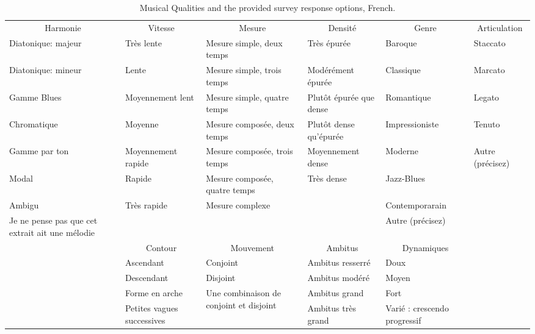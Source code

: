 \documentclass[
]{article}
\makeatletter
\newenvironment{lltable}{\begin{landscape}\begin{center}\begin{ThreePartTable}}{\end{ThreePartTable}\end{center}\end{landscape}}
\newcommand\LastLTentrywidth{1em}
\newlength\longtablewidth
\newcommand{\getlongtablewidth}{\begingroup \ifcsname LT@\roman{LT@tables}\endcsname \global\longtablewidth=0pt \renewcommand{\LT@entry}[2]{\global\advance\longtablewidth by ##2\relax\gdef\LastLTentrywidth{##2}}\@nameuse{LT@\roman{LT@tables}} \fi \endgroup}
\makeatother
\begin{document}
\begin{lltable}
\begin{footnotesize}
\begin{longtable}{p{}p{}p{}p{}p{}p{}}\noalign{\getlongtablewidth\global\LTcapwidth=\longtablewidth}
\caption{\label{tab:qualitiestablefr}Musical Qualities and the provided survey response options, French.}\\
\toprule[.8pt]
 \multicolumn{1}{c}{Harmonie} & \multicolumn{1}{c}{Vitesse} & \multicolumn{1}{c}{Mesure} & \multicolumn{1}{c}{Densité} & \multicolumn{1}{c}{Genre} & \multicolumn{1}{c}{Articulation}\\
 \midrule
      Diatonique: majeur & Très lente & Mesure simple, deux temps & Très épurée & Baroque & Staccato \\
      Diatonique: mineur & Lente & Mesure simple, trois temps & Modérément épurée & Classique & Marcato \\
      Gamme Blues & Moyennement lent & Mesure simple, quatre temps & Plutôt épurée que dense & Romantique & Legato\\
      Chromatique & Moyenne & Mesure composée, deux temps & Plutôt dense qu’épurée & Impressioniste & Tenuto\\
      Gamme par ton & Moyennement rapide & Mesure composée, trois temps & Moyennement dense & Moderne & Autre (précisez) \\       
      Modal  & Rapide & Mesure composée, quatre temps & Très dense & Jazz-Blues & \\
      Ambigu  & Très rapide & Mesure complexe & & Contemporarain & \\
      \multirow{2}{0.2\textwidth}{Je ne pense pas que cet extrait ait une mélodie}  & & & & Autre (précisez) & \\
      Autre (précisez)  & & & & & \\
\bottomrule\addlinespace[.5em]
 & \multicolumn{1}{c}{Contour} & \multicolumn{1}{c}{Mouvement} & \multicolumn{1}{c}{Ambitus} & \multicolumn{1}{c}{Dynamiques} & \\
 \cmidrule[.5pt]{2-5}
  & Ascendant & Conjoint & Ambitus resserré & Doux & \\
  & Descendant & Disjoint & Ambitus modéré & Moyen  & \\
  & Forme en arche & \multirow{2}{0.2\textwidth}{Une combinaison de conjoint et disjoint} & Ambitus grand & Fort  & \\
  & Petites vagues successives &  & Ambitus très grand & Varié : crescendo progressif &\\

\end{longtable}
\end{footnotesize}
\end{lltable}
\end{document}
